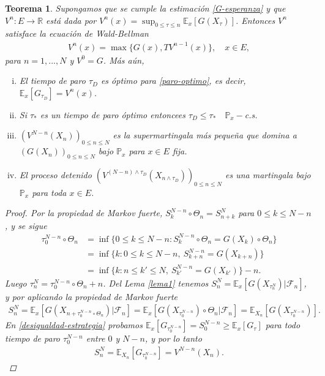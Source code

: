 \documentclass{article}
\newtheorem{teorema}[theorem]{Teorema}
\numberwithin{equation}{section}
\begin{document}
\begin{teorema}
    Supongamos que se cumple la estimación \eqref{G-esperanza} y que $V^n : E \to \mathbb{R}$ está dada por $V^n(x) = \sup_{0\leq \tau \leq n}\mathbb{E}_x\left[G(X_\tau)\right]$. Entonces $V^n$ satisface la ecuación de Wald-Bellman 
    \begin{align}\label{W-B}
        V^n(x) = \max\{G(x), TV^{n-1}(x)\}, \quad x \in E,
    \end{align}
    para $n=1,...,N$ y $V^0 = G$. Más aún,
\begin{enumerate}[(i)]
    \item El tiempo de paro $\tau_D$ es óptimo para \eqref{paro-optimo}, es decir, $\mathbb{E}_x\left[G_{\tau_D}\right] = V^n(x)$.
    \item Si $\tau_{*}$ es un tiempo de paro óptimo entoncees $\tau_D \leq \tau_{*} \quad \mathbb{P}_x-$c.s.
    \item $(V^{N-n}(X_n))_{0\leq n\leq N}$ es la supermartingala más pequeña que domina a $(G(X_n))_{0\leq n \leq N}$ bajo $\mathbb{P}_x$ para $x\in E$ fija.
    \item El proceso detenido $(V^{(N-n)\land \tau_D}(X_{n\land \tau_D}))_{0\leq n \leq N}$ es una martingala bajo $\mathbb{P}_x$ para toda $x \in E$.
\end{enumerate}

\begin{proof}
    Por la propiedad de Markov fuerte, $S^{N-n}_k \circ \Theta_n = S^N_{n+k}$  para $0\leq k \leq N-n$, y se sigue
    \begin{align*}
        \tau^{N-n}_0\circ\Theta_n &= \inf\{0\leq k \leq N-n : S^{N-n}_k\circ\Theta_n = G(X_k)\circ \Theta_n\}\\
        &= \inf\{k : 0\leq k \leq N-n, \: S^{N-n}_{k+n} = G(X_{k+n})\}\\
        &= \inf\{k : n\leq k' \leq N, \: S^{N-n}_{k'} = G(X_{k'})\} - n.
    \end{align*}
    Luego $\tau_n^N = \tau^{N-n}_0\circ\Theta_n + n$.
    Del Lema \ref{lema1} tenemos $S_n^N = \mathbb{E}_x\left[G(X_{\tau_n^N}) | \mathcal{F}_n\right]$, y por aplicando la propiedad de Markov fuerte
    \begin{align*}
        S_n^N = \mathbb{E}_x\left[G(X_{n+\tau_0^{N-n}\circ\Theta_n}) | \mathcal{F}_n\right] = \mathbb{E}_x\left[G(X_{\tau_0^{N-n}})\circ\Theta_n | \mathcal{F}_n\right] = \mathbb{E}_{X_n}\left[G(X_{\tau_0^{N-n}})\right].
    \end{align*}
    En  \eqref{desigualdad-estrategia} probamos $\mathbb{E}_x\left[G_{\tau_0^{N-n}} \right] = S_0^{N-n} \geq \mathbb{E}_x\left[G_\tau \right]$ para todo tiempo de paro $\tau_0^{N-n}$ entre $0$ y $N-n$, y por lo tanto
    \begin{align}\label{igualdad-clave}
        S_n^N = \mathbb{E}_{X_n}\left[G_{\tau_0^{N-n}}\right] = V^{N-n}(X_n).
    \end{align}


\end{proof}
\end{teorema}
\end{document}
